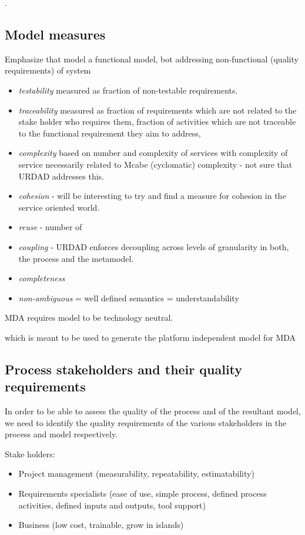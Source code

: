 \cite{lange_managing_2005,lange_improving_2006}.

\subsection{Model measures}
Emphasize that model a functional model, bot addressing non-functional (quality requirements) of system

\begin{itemize}
  \item \emph{testability} measured as fraction of non-testable requirements.
  \item \emph{traceability} measured as fraction of requirements which are not related to the stake holder who requires them, fraction of activities which are not traceable to the functional requirement they aim to address, 
  \item \emph{complexity} based on number and complexity of services with complexity of service necessarily related to Mcabe (cyclomatic) complexity - not sure that URDAD addresses this.
  \item \emph{cohesion} - will be interesting to try and find a measure for cohesion in the service oriented world.
  \item \emph{reuse} - number of
  \item \emph{coupling} - URDAD enforces decoupling across levels of granularity in both, the process and the metamodel.
  \item \emph{completeness}
  \item \emph{non-ambiguous} = well defined semantics = understandability
\end{itemize}


MDA requires model to be technology neutral.


which is meant to be used to generate the platform independent model for MDA

\subsection{Process stakeholders and their quality requirements}

In order to be able to assess the quality of the process and of the resultant model, we need to identify the quality requirements of the various stakeholders in the process and model respectively.


\cite{berard_what_1995}

Stake holders:
\begin{itemize}
  \item Project management (measurability, repeatability, estimatability)
  \item Requirements specialists (ease of use, simple process, defined process activities, defined inputs and outputs, tool support)
  \item Business (low cost, trainable, grow in islands)
\end{itemize}


